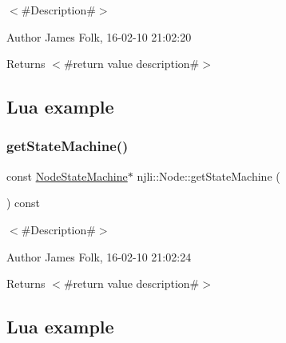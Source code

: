 $<$\#\+Description\#$>$ 

\begin{DoxyAuthor}{Author}
James Folk, 16-\/02-\/10 21\+:02\+:20
\end{DoxyAuthor}
\begin{DoxyReturn}{Returns}
$<$\#return value description\#$>$
\end{DoxyReturn}
\hypertarget{classnjli_1_1_steering_behavior_wander_ex1}{}\subsection{Lua example}\label{classnjli_1_1_steering_behavior_wander_ex1}

\begin{DoxyCodeInclude}
\end{DoxyCodeInclude}
\mbox{\label{classnjli_1_1_node_ae42a983ef4f2f4037aa94bc9a5b8a59b}} 
\subsubsection{\texorpdfstring{get\+State\+Machine()}{getStateMachine()}\hspace{0.1cm}{\footnotesize\ttfamily [2/2]}}
{\footnotesize\ttfamily const \mbox{\hyperlink{classnjli_1_1_node_state_machine}{Node\+State\+Machine}}$\ast$ njli\+::\+Node\+::get\+State\+Machine (\begin{DoxyParamCaption}{ }\end{DoxyParamCaption}) const}



$<$\#\+Description\#$>$ 

\begin{DoxyAuthor}{Author}
James Folk, 16-\/02-\/10 21\+:02\+:24
\end{DoxyAuthor}
\begin{DoxyReturn}{Returns}
$<$\#return value description\#$>$
\end{DoxyReturn}
\hypertarget{classnjli_1_1_steering_behavior_wander_ex1}{}\subsection{Lua example}\label{classnjli_1_1_steering_behavior_wander_ex1}

\begin{DoxyCodeInclude}
\end{DoxyCodeInclude}
\mbox{\label{classnjli_1_1_node_a4a6691a03731d68bc8b0c0085f219148}} 
